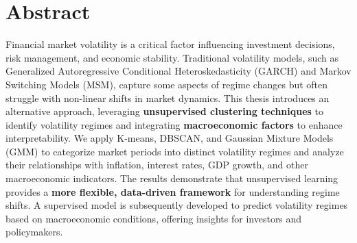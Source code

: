 \chapter*{Abstract}


Financial market volatility is a critical factor influencing investment decisions, risk management, and economic stability. Traditional volatility models, such as Generalized Autoregressive Conditional Heteroskedasticity (GARCH) and Markov Switching Models (MSM), capture some aspects of regime changes but often struggle with non-linear shifts in market dynamics. This thesis introduces an alternative approach, leveraging \textbf{unsupervised clustering techniques} to identify volatility regimes and integrating \textbf{macroeconomic factors} to enhance interpretability. We apply K-means, DBSCAN, and Gaussian Mixture Models (GMM) to categorize market periods into distinct volatility regimes and analyze their relationships with inflation, interest rates, GDP growth, and other macroeconomic indicators. The results demonstrate that unsupervised learning provides a \textbf{more flexible, data-driven framework} for understanding regime shifts. A supervised model is subsequently developed to predict volatility regimes based on macroeconomic conditions, offering insights for investors and policymakers.

